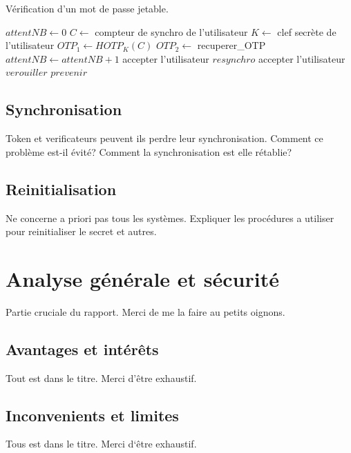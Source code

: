\documentclass{../res/univ-projet}
\begin{document}
  \begin{algorithm}
    \caption{Vérification d'un mot de passe jetable.}
    \label{HOTP:verif}
    
    \begin{algorithmic}
      \STATE $attentNB \leftarrow 0$
      \STATE $C \leftarrow$ compteur de synchro de l'utilisateur
      \STATE $K \leftarrow$ clef secrète de l'utilisateur
      \STATE $OTP_1 \leftarrow HOTP_K(C)$
	\STATE $OTP_2 \leftarrow$ recuperer\_OTP
	\STATE $attentNB \leftarrow attentNB + 1$
	  \STATE accepter l'utilisateur
	\ELSE
	    \STATE $resynchro$
	    \STATE accepter l'utilisateur
	  \ENDIF
	\ENDIF
      \ENDWHILE
      \STATE $verouiller$
      \STATE $prevenir$
    \end{algorithmic}
  \end{algorithm}

  
  \subsection{Synchronisation}
  Token et verificateurs peuvent ils perdre leur synchronisation. Comment ce problème est-il évité? Comment la synchronisation est elle rétablie?
  
  \subsection{Reinitialisation}
  Ne concerne a priori pas tous les systèmes. Expliquer les procédures a utiliser pour reinitialiser le secret et autres.
  
\section{Analyse générale et sécurité}
Partie cruciale du rapport. Merci de me la faire au petits oignons.

  \subsection{Avantages et intér\^ets}
  Tout est dans le titre. Merci d'\^etre exhaustif.
  
  \subsection{Inconvenients et limites}
  Tous est dans le titre. Merci d`\^etre exhaustif.
  
\end{document}
